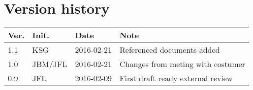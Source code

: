 \chapter*{Version history}
\label{app:rev_his}


\begin{tabular}{b{1cm} b{1cm} b{2cm} b{8cm}}
    \textbf{Ver.} & \textbf{Init.} & \textbf{Date} & \textbf{Note} \\
    \hline
    1.1 & KSG & 2016-02-21 & Referenced documents added \\
    1.0 & JBM/JFL & 2016-02-21 & Changes from meting with costumer \\
    0.9 & JFL & 2016-02-09 & First draft ready external review \\
\end{tabular}
